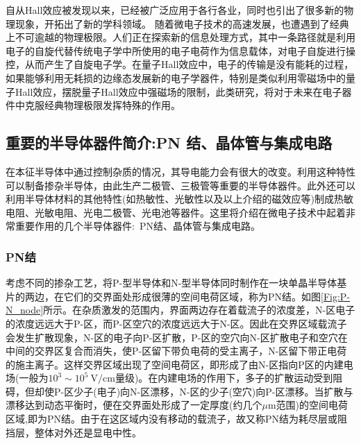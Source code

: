 自从Hall效应被发现以来，已经被广泛应用于各行各业，同时也引出了很多新的物理现象，开拓出了新的学科领域。%
随着微电子技术的高速发展，也遭遇到了经典上不可逾越的物理极限。人们正在探索新的信息处理方式，其中一条路径就是利用电子的自旋代替传统电子学中所使用的电子电荷作为信息载体，对电子自旋进行操控，从而产生了自旋电子学。在量子Hall效应中，电子的传输是没有能耗的过程，如果能够利用无耗损的边缘态发展新的电子学器件，特别是类似利用零磁场中的量子Hall效应，摆脱量子Hall效应中强磁场的限制，此类研究，将对于未来在电子器件中克服经典物理极限发挥特殊的作用。 

\subsection{重要的半导体器件简介:PN 结、晶体管与集成电路}
在本征半导体中通过控制杂质的情况，其导电能力会有很大的改变。利用这种特性可以制备掺杂半导体，由此生产二极管、三极管等重要的半导体器件。此外还可以利用半导体材料的其他特性(如热敏性、光敏性以及以上介绍的磁效应等)制成热敏电阻、光敏电阻、光电二极管、光电池等器件。这里将介绍在微电子技术中起着非常重要作用的几个半导体器件:~PN结、晶体管与集成电路。

\subsubsection{PN结} 
考虑不同的掺杂工艺，将P-型半导体和N-型半导体同时制作在一块单晶半导体基片的两边，在它们的交界面处形成很薄的空间电荷区域，称为PN结。如图\ref{Fig:P-N_node}所示。在杂质激发的范围内，界面两边存在着载流子的浓度差，N-区电子的浓度远远大于P-区，而P-区空穴的浓度远远大于N-区。因此在交界区域载流子会发生扩散现象，N-区的电子向P-区扩散，P-区的空穴向N-区扩散电子和空穴在中间的交界区复合而消失，使P-区留下带负电荷的受主离子，N-区留下带正电荷的施主离子。这样交界区域出现了空间电荷区，即形成了由N-区指向P区的内建电场(一般为$10^3\sim10^5~\mathrm{V/cm}$量级)。在内建电场的作用下，多子的扩散运动受到阻碍，但却使P-区少子(电子)向N-区漂移，N-区的少子(空穴)向P-区漂移。当扩散与漂移达到动态平衡时，便在交界面处形成了一定厚度(约几个$\mu\mathrm{m}$范围)的空间电荷区域,即为PN结。由于在这区域内没有移动的载流子，故又称PN结为耗尽层或阻挡层，整体对外还是显电中性。 


